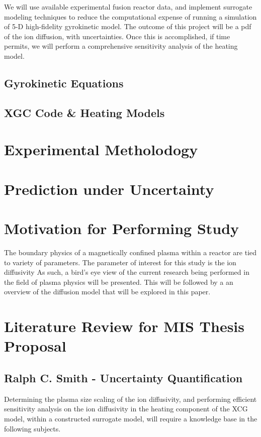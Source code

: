 \documentclass{article}
\begin{document}

We will use available experimental fusion reactor data, and implement surrogate modeling techniques to reduce the computational expense of running a simulation of 5-D high-fidelity gyrokinetic model. The outcome of this project will be a pdf of the ion diffusion, with uncertainties. Once this is accomplished, if time permits, we will perform a %
comprehensive sensitivity analysis of the heating model.

\subsection{Gyrokinetic Equations}
\subsection{XGC Code \& Heating Models}
\section{Experimental Metholodogy}

\section{Prediction under Uncertainty}



\section{Motivation for Performing Study}

 \cite{PPPL_P:2}
The boundary physics of a magnetically confined plasma within a reactor are tied to variety of parameters. The parameter of interest for this study is the ion diffusivity 
As such, a bird's eye view of the current research being performed in the field of plasma physics will be presented. \cite{J_Friedberg:1}
This will be followed by a an overview of the diffusion model that will be explored in this paper.\\
\section{Literature Review for MIS Thesis Proposal}
\subsection*{Ralph C. Smith - Uncertainty Quantification}
Determining the plasma size scaling of the ion diffusivity, and performing efficient sensitivity analysis on the ion diffusivity in the heating component of the XCG model, within a constructed surrogate model, will require a knowledge base in the following subjects.\\  
\end{document}
